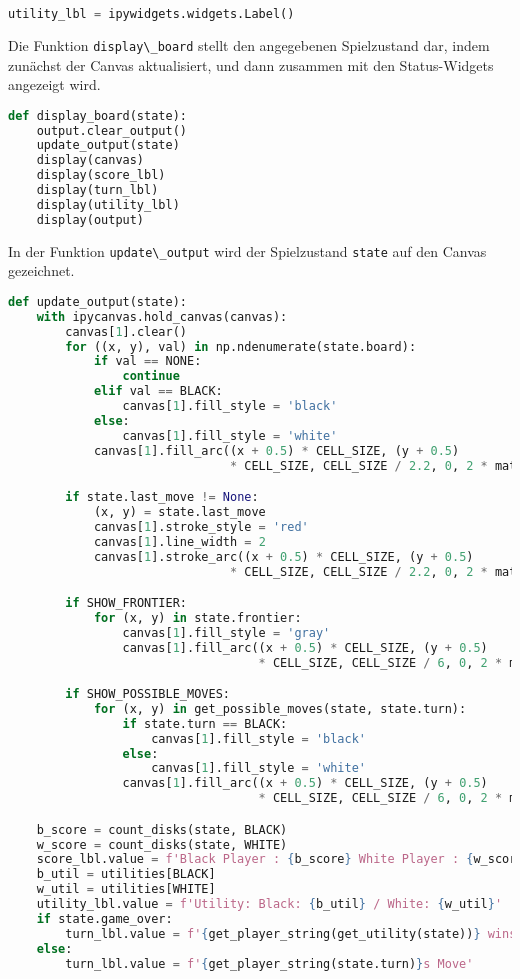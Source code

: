 \begin{lstlisting}[language=Python]
utility_lbl = ipywidgets.widgets.Label()
\end{lstlisting}

Die Funktion \passthrough{\lstinline!display\_board!} stellt den
angegebenen Spielzustand dar, indem zunächst der Canvas aktualisiert,
und dann zusammen mit den Status-Widgets angezeigt wird.

\begin{lstlisting}[language=Python]
def display_board(state):
    output.clear_output()
    update_output(state)
    display(canvas)
    display(score_lbl)
    display(turn_lbl)
    display(utility_lbl)
    display(output)
\end{lstlisting}

In der Funktion \passthrough{\lstinline!update\_output!} wird der
Spielzustand \passthrough{\lstinline!state!} auf den Canvas gezeichnet.

\begin{lstlisting}[language=Python]
def update_output(state):
    with ipycanvas.hold_canvas(canvas):
        canvas[1].clear()
        for ((x, y), val) in np.ndenumerate(state.board):
            if val == NONE:
                continue
            elif val == BLACK:
                canvas[1].fill_style = 'black'
            else:
                canvas[1].fill_style = 'white'
            canvas[1].fill_arc((x + 0.5) * CELL_SIZE, (y + 0.5)
                               * CELL_SIZE, CELL_SIZE / 2.2, 0, 2 * math.pi)

        if state.last_move != None:
            (x, y) = state.last_move
            canvas[1].stroke_style = 'red'
            canvas[1].line_width = 2
            canvas[1].stroke_arc((x + 0.5) * CELL_SIZE, (y + 0.5)
                               * CELL_SIZE, CELL_SIZE / 2.2, 0, 2 * math.pi)

        if SHOW_FRONTIER:
            for (x, y) in state.frontier:
                canvas[1].fill_style = 'gray'
                canvas[1].fill_arc((x + 0.5) * CELL_SIZE, (y + 0.5)
                                   * CELL_SIZE, CELL_SIZE / 6, 0, 2 * math.pi)

        if SHOW_POSSIBLE_MOVES:
            for (x, y) in get_possible_moves(state, state.turn):
                if state.turn == BLACK:
                    canvas[1].fill_style = 'black'
                else:
                    canvas[1].fill_style = 'white'
                canvas[1].fill_arc((x + 0.5) * CELL_SIZE, (y + 0.5)
                                   * CELL_SIZE, CELL_SIZE / 6, 0, 2 * math.pi)

    b_score = count_disks(state, BLACK)
    w_score = count_disks(state, WHITE)
    score_lbl.value = f'Black Player : {b_score} White Player : {w_score}'
    b_util = utilities[BLACK]
    w_util = utilities[WHITE]
    utility_lbl.value = f'Utility: Black: {b_util} / White: {w_util}'
    if state.game_over:
        turn_lbl.value = f'{get_player_string(get_utility(state))} wins'
    else:
        turn_lbl.value = f'{get_player_string(state.turn)}s Move'
\end{lstlisting}

